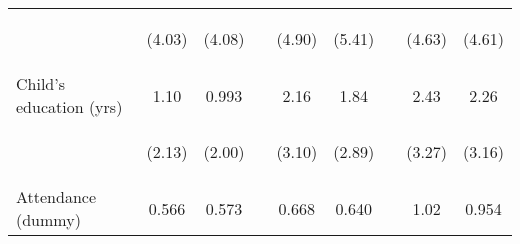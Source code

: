 \documentclass{article}[11pt,subeqn]
\begin{document}
\begin{spacing}{1.5}
\begin{table}[ht]
\begin{center}
\begin{tabular}{lccp{5mm}ccp{5mm}cc}
\begin{footnotesize}\end{footnotesize}	& \begin{footnotesize} (4.03)\end{footnotesize} & \begin{footnotesize} (4.08)\end{footnotesize} & \begin{footnotesize} 	\end{footnotesize} & \begin{footnotesize} (4.90)\end{footnotesize} & \begin{footnotesize} (5.41)\end{footnotesize} & \begin{footnotesize} 	\end{footnotesize} & \begin{footnotesize} (4.63)\end{footnotesize} & \begin{footnotesize} (4.61)\end{footnotesize}	\\
Child's education (yrs)	&	1.10	&	0.993	&	&	2.16	&	1.84	&	&	2.43	&	2.26		\\
\begin{footnotesize}\end{footnotesize}	& \begin{footnotesize} (2.13)\end{footnotesize} & \begin{footnotesize} (2.00)\end{footnotesize} & \begin{footnotesize} 	\end{footnotesize} & \begin{footnotesize} (3.10)\end{footnotesize} & \begin{footnotesize} (2.89)\end{footnotesize} & \begin{footnotesize} 	\end{footnotesize} & \begin{footnotesize} (3.27)\end{footnotesize} & \begin{footnotesize} (3.16)\end{footnotesize}	\\
Attendance (dummy)	&	0.566	&	0.573	&	&	0.668	&	0.640	&	&	1.02	&	0.954		\\

\end{tabular}
\end{center}
\end{table}
\end{spacing}
\end{document}

